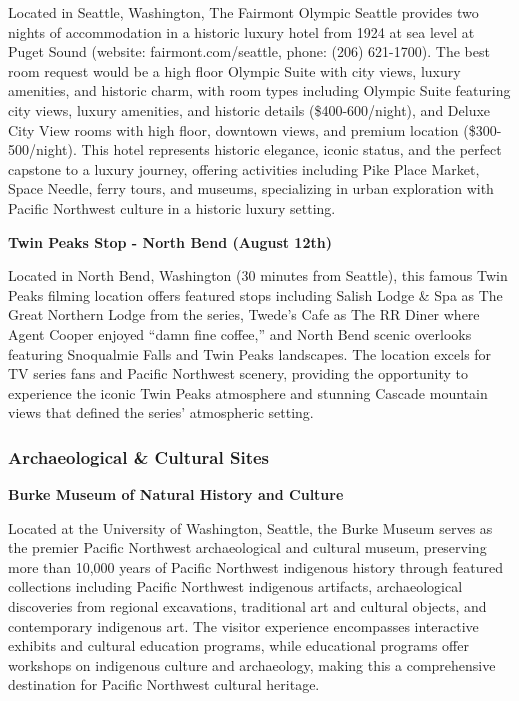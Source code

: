 \documentclass[
  11pt,
  letterpaper,
  DIV=10,
  numbers=noendperiod]{scrartcl}
\begin{document}
Located in Seattle, Washington, The Fairmont Olympic Seattle provides
two nights of accommodation in a historic luxury hotel from 1924 at sea
level at Puget Sound (website: fairmont.com/seattle, phone: (206)
621-1700). The best room request would be a high floor Olympic Suite
with city views, luxury amenities, and historic charm, with room types
including Olympic Suite featuring city views, luxury amenities, and
historic details (\$400-600/night), and Deluxe City View rooms with high
floor, downtown views, and premium location (\$300-500/night). This
hotel represents historic elegance, iconic status, and the perfect
capstone to a luxury journey, offering activities including Pike Place
Market, Space Needle, ferry tours, and museums, specializing in urban
exploration with Pacific Northwest culture in a historic luxury setting.

\textbf{Twin Peaks Stop - North Bend (August 12th)}

Located in North Bend, Washington (30 minutes from Seattle), this famous
Twin Peaks filming location offers featured stops including Salish Lodge
\& Spa as The Great Northern Lodge from the series, Twede's Cafe as The
RR Diner where Agent Cooper enjoyed ``damn fine coffee,'' and North Bend
scenic overlooks featuring Snoqualmie Falls and Twin Peaks landscapes.
The location excels for TV series fans and Pacific Northwest scenery,
providing the opportunity to experience the iconic Twin Peaks atmosphere
and stunning Cascade mountain views that defined the series' atmospheric
setting.

\subsubsection{Archaeological \& Cultural
Sites}\label{archaeological-cultural-sites-5}

\textbf{Burke Museum of Natural History and Culture}

Located at the University of Washington, Seattle, the Burke Museum
serves as the premier Pacific Northwest archaeological and cultural
museum, preserving more than 10,000 years of Pacific Northwest
indigenous history through featured collections including Pacific
Northwest indigenous artifacts, archaeological discoveries from regional
excavations, traditional art and cultural objects, and contemporary
indigenous art. The visitor experience encompasses interactive exhibits
and cultural education programs, while educational programs offer
workshops on indigenous culture and archaeology, making this a
comprehensive destination for Pacific Northwest cultural heritage.
\end{document}
